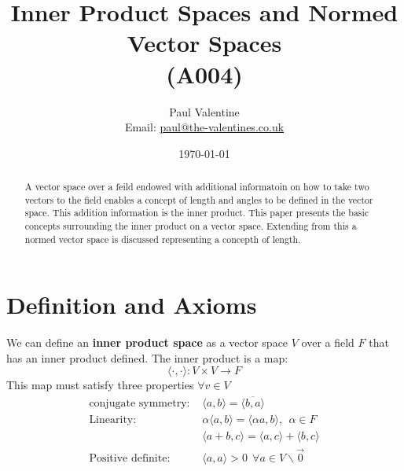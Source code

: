 \documentclass[a4paper]{article}
\title{\textbf{Inner Product Spaces and Normed Vector Spaces}\\(A004)}
\author{Paul Valentine\\ Email: \href{mailto:paul@the-valentines.co.uk}{paul@the-valentines.co.uk}}
\date{\today}
\begin{document}
\maketitle
\begin{abstract}
  A vector space over a feild endowed with additional informatoin on how to take two vectors to the field enables a concept of length and angles to be defined in the vector space. This addition information is the inner product. This paper presents the basic concepts surrounding the inner product on a vector space. Extending from this a normed vector space is discussed representing a concepth of length.
\end{abstract}
\section{Definition and Axioms}
We can define an \textbf{inner product space} as a vector space $V$ over a field $F$ that has an inner product defined. The inner product is a map:
\begin{equation}
  \langle \cdot,\cdot \rangle : V \times V \to F
\end{equation}
This map must satisfy three properties $\forall v \in V$
\begin{align}
  \text{conjugate symmetry:  }&\langle a, b \rangle = \overline{\langle b,a \rangle}\\
  \text{Linearity:  }&\alpha \langle a,b \rangle = \langle \alpha a,b \rangle, \: \: \alpha \in F\\
  &\langle a+b,c \rangle = \langle a,c \rangle + \langle b,c \rangle\\
  \text{Positive definite:  } &\langle a,a \rangle > 0 \: \: \forall a \in V \backslash \vec{0}
\end{align}
\end{document}
